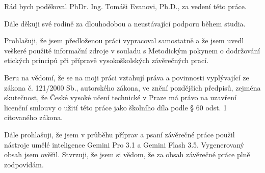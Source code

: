 \documentclass[czech,bachelor,oneside]{ctufit-thesis}
\begin{document}
\frontmatter\frontmatterinit %

\thispagestyle{empty}\maketitle\thispagestyle{empty}\cleardoublepage %


\imprintpage %
\stopTOCentries

\begin{acknowledgmentpage}
	Rád bych poděkoval PhDr. Ing. Tomáši Evanovi, Ph.D., za vedení této práce.

	Dále děkuji své rodině za dlouhodobou a neustávající podporu během studia.
\end{acknowledgmentpage}


\begin{declarationpage}
	Prohlašuji, že jsem předloženou práci vypracoval samostatně a že jsem uvedl veškeré
    použité informační zdroje v souladu s Metodickým pokynem o dodržování etických
    principů při přípravě vysokoškolských závěrečných prací.
    
    Beru na vědomí, že se na moji práci vztahují práva a povinnosti vyplývající ze zákona č. 121/2000 Sb., autorského zákona, ve znění pozdějších předpisů, zejména
    skutečnost, že České vysoké učení technické v Praze má právo na uzavření licenční
    smlouvy o užití této práce jako školního díla podle § 60 odst. 1 citovaného zákona.

	Dále prohlašuji, že jsem v průběhu příprav a psaní závěrečné práce použil nástroje umělé 
	inteligence Gemini Pro 3.1 a Gemini Flash 3.5. Vygenerovaný obsah jsem ověřil. Stvrzuji, že jsem si vědom, že za obsah 
	závěrečné práce plně zodpovídám.
\end{declarationpage}
\end{document}
